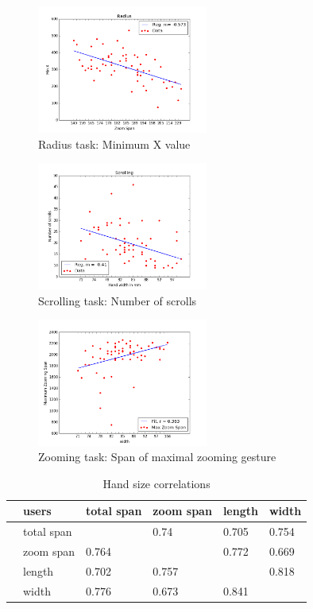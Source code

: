 \documentclass{sigchi}
\begin{document}
\begin{figure}[ht]
	\centering
  \includegraphics[width=0.5\textwidth]{figures/plotRadius.png}
	\caption{Radius task: Minimum X value}
	\label{plotRadius}
\end{figure}

\begin{figure}[ht]
	\centering
  \includegraphics[width=0.5\textwidth]{figures/plotScrolling.png}
	\caption{Scrolling task: Number of scrolls}
	\label{plotScrolling}
\end{figure}

\begin{figure}[ht]
	\centering
  \includegraphics[width=0.5\textwidth]{figures/plotZooming.png}
	\caption{Zooming task: Span of maximal zooming gesture}
	\label{plotZooming}
\end{figure}


\begin{table}[ht]
\centering
\caption{Hand size correlations}
\label{handSizeCorrelations}
\begin{tabular}{ll|llll}
 &users  &total span  &zoom span  &length  &width  \\ \hline
 &total span  &  &0.74  &0.705  &0.754 \\
 &zoom span  &0.764  &  &0.772  &0.669 \\
 &length  &0.702  &0.757  &  &0.818 \\
 &width  &0.776  &0.673  &0.841  &
\end{tabular}
\end{table}
\end{document}
